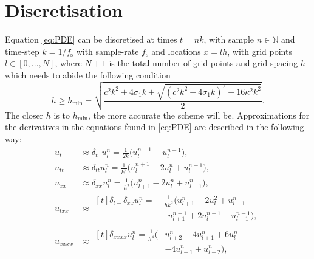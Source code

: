 \documentclass[twoside,a4paper]{article}
\begin{document}
\section{Discretisation}\label{sec:discretisation}
Equation \eqref{eq:PDE} can be discretised at times $t = nk$, with sample $n \in \mathbb{N}$ and time-step $k = 1 / f_\text{s}$ with sample-rate $f_\text{s}$ and locations $x = lh$, with grid points $l \in [0,...,N]$, where $N + 1$ is the total number of grid points and grid spacing $h$ which needs to abide the following condition \cite{Bilbao2009}
\begin{equation}
    h \geq h_\text{min} = \sqrt{\frac{c^2k^2+4 \sigma_1k+\sqrt{(c^2k^2+4\sigma_1k)^2+16\kappa^2k^2}}{2}}.
\end{equation}
The closer $h$ is to $h_\text{min}$, the more accurate the scheme will be. 
Approximations for the derivatives in the equations found in \ref{eq:PDE} are described in the following way: 
\begin{subequations}\label{eq:approximations}
    \begin{align}
        \label{eq:centerTime}
        u_{t} &\approx \delta_{t\cdot} u^n_l = \frac{1}{2k}\big(u_l^{n+1}-u_l^{n-1}\big),\\
        \label{eq:secondTime}
        u_{tt} &\approx \delta_{tt}u_l^n = \frac{1}{k^2} \big(u_l^{n+1} - 2u_l^n + u_l^{n-1}\big),\\
        \label{eq:secondSpacex}
        u_{xx} &\approx \delta_{xx}u_l^n = \frac{1}{h^2}\big(u_{l+1}^n - 2u_l^n + u_{l-1}^n\big),\\
        u_{txx} &\approx 
        \begin{aligned}[t]\delta_{t-}\delta_{xx}u_l^n =& \; \frac{1}{hk^2}\big(u_{l+1}^n - 2u_l^2 + u_{l-1}^n \\
        &- u_{l+1}^{n-1} + 2u_l^{n-1} - u_{l-1}^{n-1}\big),
        \end{aligned}\\
        \label{eq:fourthSpacex}
        u_{xxxx} &\approx\begin{aligned}[t] \delta_{xxxx}u_l^n = \frac{1}{h^4}\big(&u_{l+2}^n - 4u_{l+1}^n + 6u_l^n \\
        &- 4u_{l-1}^n +u_{l-2}^n\big),
        \end{aligned}
    \end{align}
\end{subequations}
\end{document}
